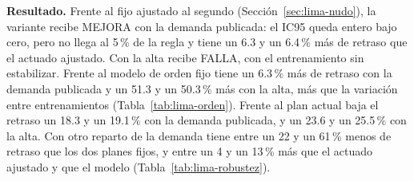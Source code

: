 \noindent\textbf{Resultado.} Frente al fijo ajustado al segundo
(Sección~\ref{sec:lima-nudo}), la variante recibe MEJORA con la demanda
publicada: el IC95 queda entero bajo cero, pero no llega al 5\,\% de la
regla y tiene un 6.3 y un 6.4\,\% más de retraso que el actuado
ajustado. Con la alta recibe FALLA, con el entrenamiento sin
estabilizar. Frente al modelo de orden fijo tiene un 6.3\,\% más de
retraso con la demanda publicada y un 51.3 y un 50.3\,\% más con la
alta, más que la variación entre entrenamientos
(Tabla~\ref{tab:lima-orden}). Frente al plan actual baja el retraso un
18.3 y un 19.1\,\% con la demanda publicada, y un 23.6 y un 25.5\,\% con
la alta. Con otro reparto de la demanda tiene entre un 22 y un 61\,\%
menos de retraso que los dos planes fijos, y entre un 4 y un 13\,\% más
que el actuado ajustado y que el modelo (Tabla~\ref{tab:lima-robustez}).

\begin{table}[!tbp]
\centering
\footnotesize
\setlength{\tabcolsep}{3pt}
\resizebox{\textwidth}{!}{}
\caption[Caso Lima, el nudo: la variante de orden libre frente al modelo]{Caso Lima, el nudo: la variante de orden libre frente al modelo de orden fijo, en la misma red. Retraso total de los entrenamientos citados en las dos tandas, cambio de la variante frente al modelo, con su IC95 y el valor $p$ de la prueba de Wilcoxon pareada, y media por semilla de los tres entrenamientos de cada uno, con el rango entre ellos entre paréntesis. Si la diferencia entre las dos medias no supera el mayor rango en las dos tandas, la diferencia no se distingue de la variación entre entrenamientos.}
\label{tab:lima-orden}
\end{table}

